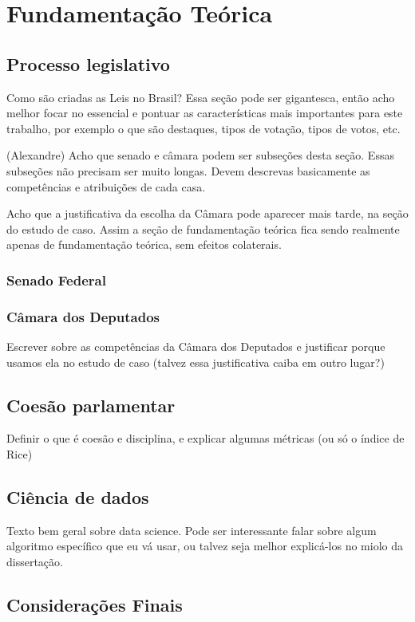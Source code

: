 \chapter{Fundamentação Teórica}\label{cap:fundamentacao}

\section{Processo legislativo}

Como são criadas as Leis no Brasil? Essa seção pode ser gigantesca, então acho melhor focar no essencial e pontuar as características mais importantes para este trabalho, por exemplo o que são destaques, tipos de votação, tipos de votos, etc.



(Alexandre) Acho que senado e câmara podem ser subseções desta seção.
Essas subseções não precisam ser muito longas. Devem descrevas basicamente as competências e atribuições de cada casa.

Acho que a justificativa da escolha da Câmara pode aparecer mais tarde, na seção do estudo de caso.  
Assim a seção de fundamentação teórica fica sendo realmente apenas de fundamentação teórica, sem efeitos colaterais.

\subsection{Senado Federal}


\subsection{Câmara dos Deputados}

Escrever sobre as competências da Câmara dos Deputados e justificar porque usamos ela no estudo de caso (talvez essa justificativa caiba em outro lugar?)


\section{Coesão parlamentar}

Definir o que é coesão e disciplina, e explicar algumas métricas (ou só o índice de Rice)


\section{Ciência de dados}

Texto bem geral sobre data science. Pode ser interessante falar sobre algum algoritmo específico que eu vá usar, ou talvez seja melhor explicá-los no miolo da dissertação.

\section{Considerações Finais}





